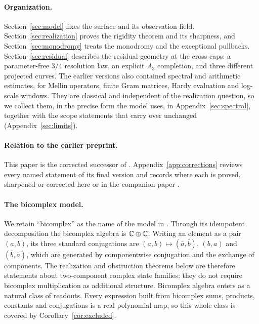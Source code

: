 \documentclass[11pt]{article}
\theoremstyle{definition}\newtheorem{definition}[theorem]{Definition}
\theoremstyle{remark}\newtheorem{remark}[theorem]{Remark}
\begin{document}
\paragraph{Organization.} Section~\ref{sec:model} fixes the surface and its
observation field. Section~\ref{sec:realization} proves the rigidity theorem
and its sharpness, and Section~\ref{sec:monodromy} treats the monodromy and
the exceptional pullbacks. Section~\ref{sec:residual} describes the residual
geometry at the cross-caps: a parameter-free $3/4$ resolution law, an
explicit $A_3$ completion, and three different projected curves. The earlier
versions also contained spectral and arithmetic estimates, for Mellin
operators, finite Gram matrices, Hardy evaluation and log-scale windows. They
are classical and independent of the realization question, so we collect them,
in the precise form the model uses, in Appendix~\ref{sec:spectral}, together
with the scope statements that carry over unchanged
(Appendix~\ref{sec:limits}).

\paragraph{Relation to the earlier preprint.} This paper is the corrected
successor of \cite{record}. Appendix~\ref{app:corrections} reviews every named
statement of its final version and records where each is proved, sharpened or
corrected here or in the companion paper \cite{companion}.

\paragraph{The bicomplex model.} We retain ``bicomplex'' as the name of the
model in \cite{record}. Through its idempotent decomposition the bicomplex
algebra is $\mathbb C\oplus\mathbb C$. Writing an element as a pair $(a,b)$, its three
standard conjugations are $(a,b)\mapsto(\bar a,\bar b)$, $(b,a)$ and
$(\bar b,\bar a)$, which are generated by componentwise conjugation and the
exchange of components. The realization and obstruction theorems below are
therefore statements about two-component complex state families; they do not
require bicomplex multiplication as additional structure. Bicomplex algebra
enters as a natural class of readouts. Every expression built from bicomplex
sums, products, constants and conjugations is a real polynomial map, so this
whole class is covered by Corollary~\ref{cor:excluded}.
\end{document}
